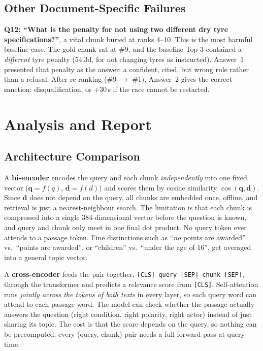 \documentclass[11pt,a4paper]{article}
\begin{document}
\subsection{Other Document-Specific Failures}
\textbf{Q12: ``What is the penalty for not using two different dry tyre specifications?''}, a vital chunk buried at
ranks 4--10. This is the most harmful baseline case. The gold chunk sat at \#9, and the
baseline Top-3 contained a \emph{different} tyre penalty (54.3d, for not changing tyres as instructed). Answer~1
presented that penalty as the answer: a confident, cited, but wrong rule rather than a refusal. After re-ranking
(\#9 $\to$ \#1), Answer~2 gives the correct sanction: disqualification, or +30\,s if the race cannot be restarted.

\section{Analysis and Report}

\subsection{Architecture Comparison}

A \textbf{bi-encoder} encodes the query and each chunk \emph{independently} into one fixed vector
($\mathbf{q}=f(q)$, $\mathbf{d}=f(d)$) and scores them by cosine similarity $\cos(\mathbf{q},\mathbf{d})$. Since
$\mathbf{d}$ does not depend on the query, all chunks are embedded once, offline, and retrieval is just a
nearest-neighbour search. The limitation is that each chunk is compressed into a single 384-dimensional vector
before the question is known, and query and chunk only meet in one final dot product. No query token ever attends
to a passage token. Fine distinctions such as ``\emph{no} points are awarded'' vs.\ ``points are awarded'', or
``children'' vs.\ ``under the age of 16'', get averaged into a general topic vector.

A \textbf{cross-encoder} feeds the pair together, \texttt{[CLS] query [SEP] chunk [SEP]}, through the transformer
and predicts a relevance score from \texttt{[CLS]}. Self-attention runs \emph{jointly across the tokens of both
texts} in every layer, so each query word can attend to each passage word. The model can check whether the passage
actually answers the question (right condition, right polarity, right actor) instead of just sharing its topic. The
cost is that the score depends on the query, so nothing can be precomputed: every (query, chunk) pair needs a full
forward pass at query time.
\end{document}
